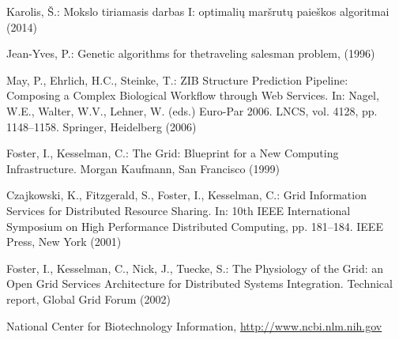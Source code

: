\documentclass[runningheads,a4paper]{llncs}
\begin{document}
\begin{thebibliography}{4}

 Karolis, Š.: Mokslo tiriamasis darbas I: optimalių maršrutų paieškos algoritmai (2014)

 Jean-Yves, P.: Genetic algorithms for thetraveling salesman problem, (1996)

 May, P., Ehrlich, H.C., Steinke, T.: ZIB Structure Prediction Pipeline:
Composing a Complex Biological Workflow through Web Services. In: Nagel,
W.E., Walter, W.V., Lehner, W. (eds.) Euro-Par 2006. LNCS, vol. 4128,
pp. 1148--1158. Springer, Heidelberg (2006)

 Foster, I., Kesselman, C.: The Grid: Blueprint for a New Computing
Infrastructure. Morgan Kaufmann, San Francisco (1999)

 Czajkowski, K., Fitzgerald, S., Foster, I., Kesselman, C.: Grid
Information Services for Distributed Resource Sharing. In: 10th IEEE
International Symposium on High Performance Distributed Computing, pp.
181--184. IEEE Press, New York (2001)

 Foster, I., Kesselman, C., Nick, J., Tuecke, S.: The Physiology of the
Grid: an Open Grid Services Architecture for Distributed Systems
Integration. Technical report, Global Grid Forum (2002)

 National Center for Biotechnology Information, \url{http://www.ncbi.nlm.nih.gov}

\end{thebibliography}
\end{document}
